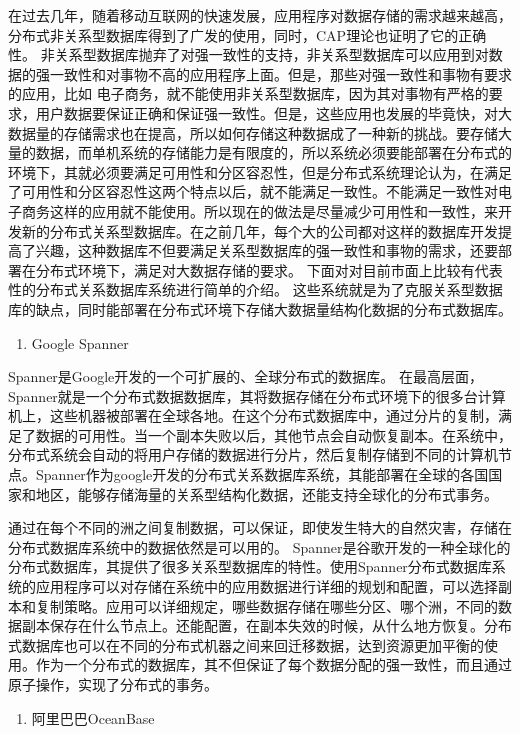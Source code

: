 在过去几年，随着移动互联网的快速发展，应用程序对数据存储的需求越来越高，分布式非关系型数据库得到了广发的使用，同时，CAP理论也证明了它的正确性。
非关系型数据库抛弃了对强一致性的支持，非关系型数据库可以应用到对数据的强一致性和对事物不高的应用程序上面。但是，那些对强一致性和事物有要求的应用，比如
电子商务，就不能使用非关系型数据库，因为其对事物有严格的要求，用户数据要保证正确和保证强一致性。但是，这些应用也发展的毕竟快，对大数据量的存储需求也在提高，所以如何存储这种数据成了一种新的挑战。要存储大量的数据，而单机系统的存储能力是有限度的，所以系统必须要能部署在分布式的环境下，其就必须要满足可用性和分区容忍性，但是分布式系统理论认为，在满足了可用性和分区容忍性这两个特点以后，就不能满足一致性。不能满足一致性对电子商务这样的应用就不能使用。所以现在的做法是尽量减少可用性和一致性，来开发新的分布式关系型数据库。在之前几年，每个大的公司都对这样的数据库开发提高了兴趣，这种数据库不但要满足关系型数据库的强一致性和事物的需求，还要部署在分布式环境下，满足对大数据存储的要求。
下面对对目前市面上比较有代表性的分布式关系数据库系统进行简单的介绍。
这些系统就是为了克服关系型数据库的缺点，同时能部署在分布式环境下存储大数据量结构化数据的分布式数据库。

\begin{enumerate}
	\item Google Spanner
\end{enumerate}

	Spanner是Google开发的一个可扩展的、全球分布式的数据库。
	在最高层面，Spanner就是一个分布式数据数据库，其将数据存储在分布式环境下的很多台计算机上，这些机器被部署在全球各地。在这个分布式数据库中，通过分片的复制，满足了数据的可用性。当一个副本失败以后，其他节点会自动恢复副本。在系统中，分布式系统会自动的将用户存储的数据进行分片，然后复制存储到不同的计算机节点。Spanner作为google开发的分布式关系数据库系统，其能部署在全球的各国国家和地区，能够存储海量的关系型结构化数据，还能支持全球化的分布式事务。
		
	通过在每个不同的洲之间复制数据，可以保证，即使发生特大的自然灾害，存储在分布式数据库系统中的数据依然是可以用的。
	Spanner是谷歌开发的一种全球化的分布式数据库，其提供了很多关系型数据库的特性。使用Spanner分布式数据库系统的应用程序可以对存储在系统中的应用数据进行详细的规划和配置，可以选择副本和复制策略。应用可以详细规定，哪些数据存储在哪些分区、哪个洲，不同的数据副本保存在什么节点上。还能配置，在副本失效的时候，从什么地方恢复。分布式数据库也可以在不同的分布式机器之间来回迁移数据，达到资源更加平衡的使用。作为一个分布式的数据库，其不但保证了每个数据分配的强一致性，而且通过原子操作，实现了分布式的事务。
	
	\begin{enumerate}[resume]
		\item 阿里巴巴OceanBase
	\end{enumerate}
	
